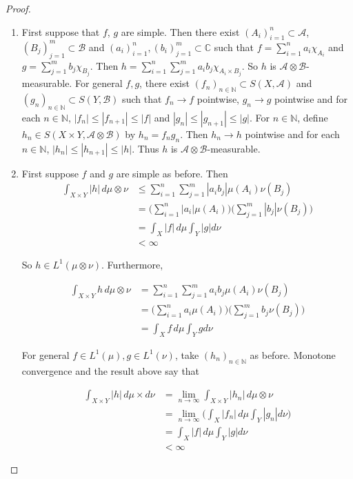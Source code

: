 \documentclass{book}
\theoremstyle{definition}
\newcommand{\C}{\mathbb{C}}
\newcommand{\N}{\mathbb{N}}
\newcommand{\MA}{\mathcal{A}}
\newcommand{\MB}{\mathcal{B}}
\DeclareMathOperator*{\0}{\mbf{0}}
\DeclareMathOperator*{\1}{\mbf{1}}
\newcommand{\limn}{\lim \limits_{n \rightarrow \infty}}
\newcommand{\dmu}{\, d \mu}
\begin{document}
	\begin{proof}\
		\begin{enumerate}
			\item First suppose that $f$, $g$ are simple. Then there exist $(A_i)_{i=1}^n \subset \MA$, $(B_j)_{j=1}^m \subset \MB$ and $(a_i)_{i=1}^n, (b_i)_{j=1}^m \subset \C$ such that $f = \sum_{i=1}^n a_i \chi_{A_i}$ and $g = \sum_{j=1}^m b_j \chi_{B_j}$. Then $h = \sum_{i=1}^n \sum_{j=1}^m a_i b_j \chi_{A_i \times B_j}$. So $h$ is $\MA \otimes \MB$-measurable. For general $f,g$, there exist $(f_n)_{n \in \N} \subset S(X, \MA)$ and $(g_n)_{n \in \N} \subset S(Y, \MB)$ such that $f_n \rightarrow f$ pointwise, $g_n \rightarrow g$ pointwise and for each $n \in \N$, $|f_n| \leq |f_{n+1}| \leq |f|$ and $|g_n| \leq |g_{n+1}| \leq |g|$. For $n \in \N$, define $h_n \in S(X \times Y, \MA \otimes \MB)$ by $h_n = f_n g_n$. Then $h_n \rightarrow h$ pointwise and for each $n \in \N$, $|h_n| \leq |h_{n+1}| \leq |h|$. Thus $h$ is $\MA \otimes \MB$-measurable.
			
			\item First suppose $f$ and $g$ are simple as before. Then  
			\begin{align*}
				\int_{X \times Y} |h| \dmu \otimes \nu 
				& \leq \sum_{i=1}^n \sum_{j=1}^m |a_i b_j| \mu(A_i) \nu(B_j)\\ 
				&= \big(\sum_{i=1}^n |a_i| \mu(A_i) \big) \big( \sum_{j=1}^m |b_j| \nu(B_j) \big)\\
				&= \int_X |f| \dmu \int_Y |g| d \nu\\
				&< \infty
			\end{align*}
			
			So $h \in L^1(\mu \otimes \nu)$. Furthermore, 
			
			\begin{align*}
				\int_{X \times Y} h \dmu \otimes \nu 
				&= \sum_{i=1}^n \sum_{j=1}^m a_i b_j \mu(A_i) \nu(B_j)\\ 
				&= \big(\sum_{i=1}^n a_i \mu(A_i) \big) \big( \sum_{j=1}^m b_j \nu(B_j) \big)\\
				&= \int_X f \dmu \int_Y gd \nu
			\end{align*}
			
			For general $f \in L^1(\mu), g \in L^1(\nu)$, take $(h_n)_{n \in \N}$ as before. Monotone convergence and the result above say that 
			
			\begin{align*}
				\int_{X \times Y} |h| \dmu \times d\nu 
				&= \limn \int_{X \times Y} |h_n|\dmu \otimes \nu\\
				&=  \limn \bigg( \int_X |f_n| \dmu \int_Y |g_n| d\nu \bigg) \\
				&= \int_X |f| \dmu \int_Y |g| d\nu\\
				& < \infty
			\end{align*}
			

\end{enumerate}
\end{proof}
\end{document}
